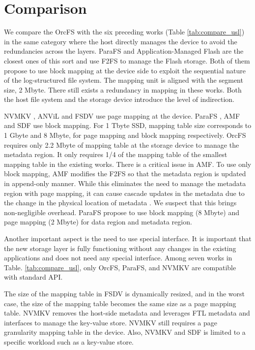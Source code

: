 \documentclass[pageno]{jpaper}
\begin{document}
\section{Comparison}
\label{sec:comparison}
We compare the OrcFS with the six preceding works (Table
\ref{tab:compare_usl}) in the same category where the host directly
manages the device to avoid the redundancies across the layers. ParaFS
\cite{zhang2016parafs} and Application-Managed Flash
\cite{lee2016application} are the closest ones of this sort and use
F2FS to manage the Flash storage. Both of them propose to use block
mapping at the device side to exploit the sequential nature of the
log-structured file system.  The mapping unit is aligned with the
segment size, 2 Mbyte.  There still exists a redundancy in mapping in
these works.  Both the host file system and the storage device
introduce the level of indirection.

NVMKV \cite{nvmkv}, ANViL \cite{anvil} and FSDV \cite{zhangremoving}
use page mapping at the device. ParaFS \cite{zhang2016parafs}, AMF
\cite{lee2016application} and SDF \cite{sdf} use block mapping. For 1
Tbyte SSD, mapping table size corresponds to 1 Gbyte and 8 Mbyte, for
page mapping and block mapping respectively. OrcFS requires only
2.2 Mbyte of mapping table at the storage device to manage the
metadata region. It only requires 1/4 of the mapping table of the smallest
mapping table in the existing works. There is a critical issue in AMF.
To use only block mapping, AMF modifies the F2FS so that the metadata
region is updated in append-only manner. While this eliminates the
need to manage the metadata region with page mapping, it can cause
cascade updates in the metadata due to the change in the physical
location of metadata \cite{rosenblum1992design}. We suspect that this
brings non-negligible overhead. ParaFS propose to use block mapping (8
Mbyte) and page mapping (2 Mbyte) for data region and metadata region.

Another important aspect is the need to use special interface. It is
important that the new storage layer is fully functioning without any
changes in the existing applications and does not need any special
interface. Among seven works in Table. \ref{tab:compare_usl}, only
OrcFS, ParaFS, and NVMKV are compatible with standard API.


The size of the mapping table in FSDV is dynamically resized, and in
the worst case, the size of the mapping table becomes the same size as
a page mapping table.  NVMKV \cite{nvmkv} removes the host-side
metadata and leverages FTL metadata and interfaces to manage the
key-value store.  NVMKV still requires a page granularity mapping table
in the device.  Also, NVMKV \cite{nvmkv} and SDF \cite{sdf} is limited to
a specific workload such as a key-value store.
\end{document}
